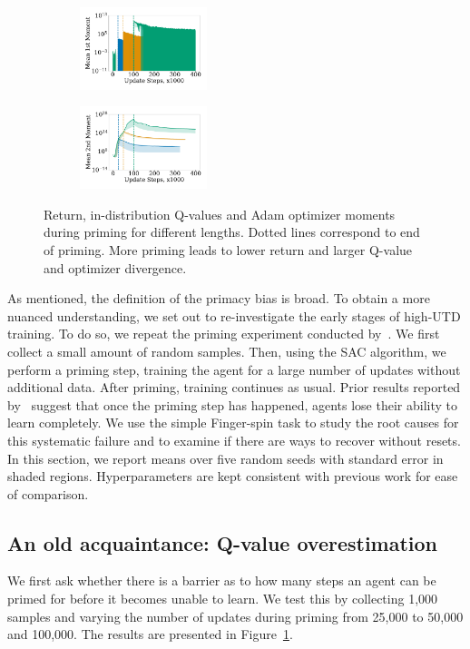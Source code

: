 \begin{figure}[t!]
\begin{subfigure}[b]{0.25\textwidth}
        \centering
        \includegraphics[width=3.7cm, trim=1cm 1cm 1cm 1cm ,clip]{figures/dissecting/priming/priming_base_exp_avg.pdf}
    \end{subfigure}%
    \begin{subfigure}[b]{0.25\textwidth}
        \centering
        \includegraphics[width=3.7cm, trim=1cm 1cm 1cm 1cm ,clip]{figures/dissecting/priming/priming_base_exp_avg_sq.pdf}
    \end{subfigure}%
    \caption{Return, in-distribution Q-values and Adam optimizer moments during priming for different lengths. Dotted lines correspond to end of priming. More priming leads to lower return and larger Q-value and optimizer divergence.}
    \label{fig:overestimation:priming_base}
\end{figure}

As mentioned, the definition of the primacy bias is broad.
To obtain a more nuanced understanding, we set out to re-investigate the early stages of high-UTD training. To do so, we repeat the priming experiment conducted by~\textcite{nikishin2022primacy}.
We first collect a small amount of random samples. Then, using the SAC algorithm, we perform a priming step, training the agent for a large number of updates without additional data. After priming, training continues as usual. Prior results reported by~\textcite{nikishin2022primacy} suggest that once the priming step has happened, agents lose their ability to learn completely. We use the simple Finger-spin task \parencite{tunyasuvunakool2020dmcontrol} to study the root causes for this systematic failure and to examine if there are ways to recover without resets. In this section, we report means over five random seeds with standard error in shaded regions. Hyperparameters are kept consistent with previous work for ease of comparison.

\subsection{An old acquaintance: Q-value overestimation} \label{sec:overestimation}
We first ask whether there is a barrier as to how many steps an agent can be primed for before it becomes unable to learn. We test this by collecting 1,000 samples and varying the number of updates during priming from 25,000 to 50,000 and 100,000. The results are presented in Figure~\ref{fig:overestimation:priming_base}. 

